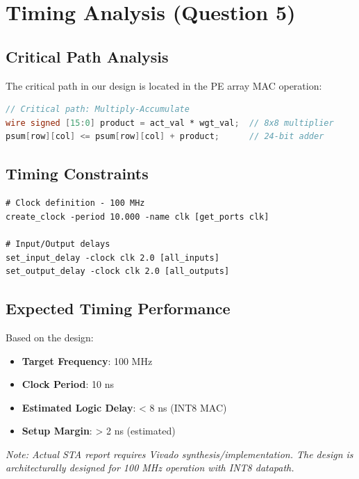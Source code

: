 \documentclass[11pt,a4paper]{article}
\begin{document}
\section{Timing Analysis (Question 5)}

\subsection{Critical Path Analysis}
The critical path in our design is located in the PE array MAC operation:
\begin{lstlisting}[language=Verilog]
// Critical path: Multiply-Accumulate
wire signed [15:0] product = act_val * wgt_val;  // 8x8 multiplier
psum[row][col] <= psum[row][col] + product;      // 24-bit adder
\end{lstlisting}

\subsection{Timing Constraints}
\begin{lstlisting}[caption=Timing Constraints (XDC)]
# Clock definition - 100 MHz
create_clock -period 10.000 -name clk [get_ports clk]

# Input/Output delays
set_input_delay -clock clk 2.0 [all_inputs]
set_output_delay -clock clk 2.0 [all_outputs]
\end{lstlisting}

\subsection{Expected Timing Performance}
Based on the design:
\begin{itemize}
    \item \textbf{Target Frequency}: 100 MHz
    \item \textbf{Clock Period}: 10 ns
    \item \textbf{Estimated Logic Delay}: < 8 ns (INT8 MAC)
    \item \textbf{Setup Margin}: > 2 ns (estimated)
\end{itemize}

\textit{Note: Actual STA report requires Vivado synthesis/implementation. The design is architecturally designed for 100 MHz operation with INT8 datapath.}

\end{document}
